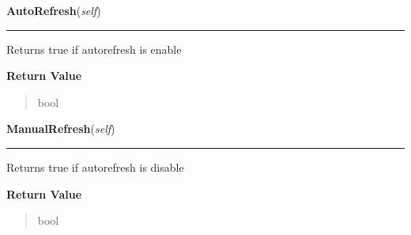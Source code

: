     \label{ImagePanel:ImagePanel:AutoRefresh}

    \vspace{0.5ex}

\hspace{.8\funcindent}\begin{boxedminipage}{\funcwidth}

    \raggedright \textbf{AutoRefresh}(\textit{self})

    \vspace{-1.5ex}

    \rule{\textwidth}{0.5\fboxrule}
\setlength{\parskip}{2ex}
    Returns true if autorefresh is enable

\setlength{\parskip}{1ex}
      \textbf{Return Value}
    \vspace{-1ex}

      \begin{quote}
      bool

      \end{quote}

    \end{boxedminipage}

    \label{ImagePanel:ImagePanel:ManualRefresh}

    \vspace{0.5ex}

\hspace{.8\funcindent}\begin{boxedminipage}{\funcwidth}

    \raggedright \textbf{ManualRefresh}(\textit{self})

    \vspace{-1.5ex}

    \rule{\textwidth}{0.5\fboxrule}
\setlength{\parskip}{2ex}
    Returns true if autorefresh is disable

\setlength{\parskip}{1ex}
      \textbf{Return Value}
    \vspace{-1ex}

      \begin{quote}
      bool

      \end{quote}

    \end{boxedminipage}

